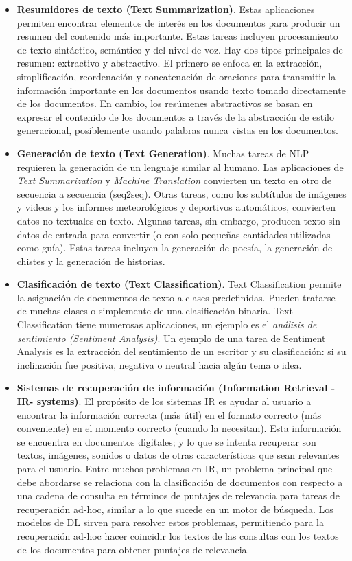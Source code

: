 \documentclass[12pt,a4paper]{article}
\begin{document}
\begin{sloppypar}
\begin{itemize}
\item \textbf{Resumidores de texto (Text Summarization)}. Estas aplicaciones permiten encontrar elementos de interés en los documentos para producir un resumen del contenido más importante. Estas tareas incluyen procesamiento de texto sintáctico, semántico y del nivel de voz. Hay dos tipos principales de resumen: extractivo y abstractivo. El primero se enfoca en la extracción, simplificación, reordenación y concatenación de oraciones para transmitir la información importante en los documentos usando texto tomado directamente de los documentos. En cambio, los resúmenes abstractivos se basan en expresar el contenido de los documentos a través de la abstracción de estilo generacional, posiblemente usando palabras nunca vistas en los documentos.

\item \textbf{Generación de texto (Text Generation)}. Muchas tareas de NLP requieren la generación de un lenguaje similar al humano. Las aplicaciones de \textit{Text Summarization} y \textit{Machine Translation} convierten un texto en otro de secuencia a secuencia (seq2seq). Otras tareas, como los subtítulos de imágenes y videos y los informes meteorológicos y deportivos automáticos, convierten datos no textuales en texto. Algunas tareas, sin embargo, producen texto sin datos de entrada para convertir (o con solo pequeñas cantidades utilizadas como guía). Estas tareas incluyen la generación de poesía, la generación de chistes y la generación de historias.

\item \textbf{Clasificación de texto (Text Classification)}. Text Classification permite la asignación de documentos de texto a clases predefinidas. Pueden tratarse de muchas clases o simplemente de una clasificación binaria. Text Classification tiene numerosas aplicaciones, un ejemplo es el \textit{análisis de sentimiento (Sentiment Analysis)}. Un ejemplo de una tarea de Sentiment Analysis es la extracción del sentimiento de un escritor y su clasificación: si su inclinación fue positiva, negativa o neutral hacia algún tema o idea.

\item \textbf{Sistemas de recuperación de información (Information Retrieval -IR- systems)}. El propósito de los sistemas IR es ayudar al usuario a encontrar la información correcta (más útil) en el formato correcto (más conveniente) en el momento correcto (cuando la necesitan). Esta información se encuentra en documentos digitales; y lo que se intenta recuperar son textos, imágenes, sonidos o datos de otras características que sean relevantes para el usuario. Entre muchos problemas en IR, un problema principal que debe abordarse se relaciona con la clasificación de documentos con respecto a una cadena de consulta en términos de puntajes de relevancia para tareas de recuperación ad-hoc, similar a lo que sucede en un motor de búsqueda. Los modelos de DL sirven para resolver estos problemas, permitiendo para la recuperación ad-hoc hacer coincidir los textos de las consultas con los textos de los documentos para obtener puntajes de relevancia.


\end{itemize}
\end{sloppypar}
\end{document}
